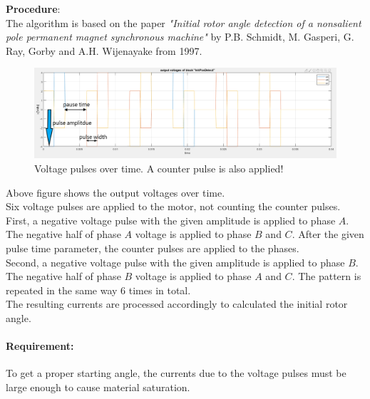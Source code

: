 %
%
%
%
%
\textbf{Procedure}:\\
The algorithm is based on the paper \textit{"Initial rotor angle detection of a nonsalient pole permanent magnet synchronous machine"} by P.B. Schmidt, M. Gasperi, G. Ray, Gorby and A.H. Wijenayake from 1997.
\begin{figure}[H]
	\includegraphics[width=\textwidth]{VoltagePulses}
	\caption{Voltage pulses over time. A counter pulse is also applied!}
	\label{fig:voltPulse}
\end{figure}
Above figure shows the output voltages over time.\\
Six voltage pulses are applied to the motor, not counting the counter pulses. First, a negative voltage pulse with the given amplitude is applied to phase $A$. The negative half of phase $A$ voltage is applied to phase $B$ and $C$. After the given pulse time parameter, the counter pulses are applied to the phases.\\
Second, a negative voltage pulse with the given amplitude is applied to phase $B$. The negative half of phase $B$ voltage is applied to phase $A$ and $C$. The pattern is repeated in the same way 6 times in total.\\
\newline
The resulting currents are processed accordingly to calculated the initial rotor angle.
\paragraph{Requirement:} To get a proper starting angle, the currents due to the voltage pulses must be large enough to cause material saturation. 